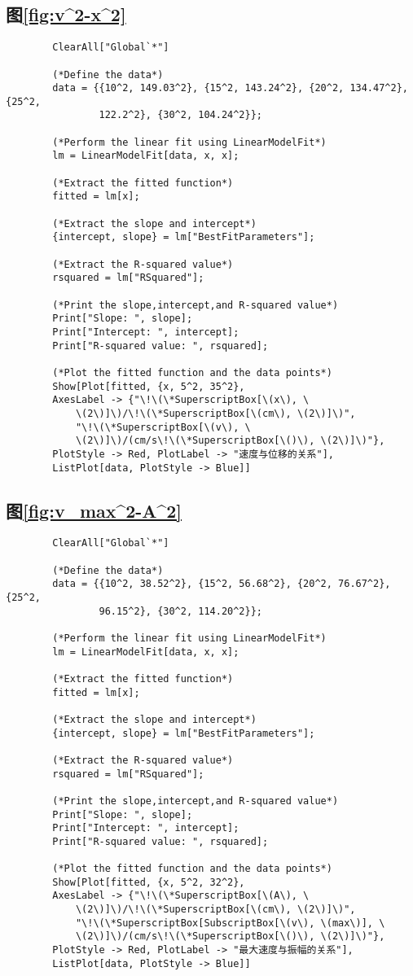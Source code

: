 \documentclass[11pt]{article}
\begin{document}
	\subsection{图\ref{fig:v^2-x^2}}
	\begin{lstlisting}
		ClearAll["Global`*"]
		
		(*Define the data*)
		data = {{10^2, 149.03^2}, {15^2, 143.24^2}, {20^2, 134.47^2}, {25^2, 
				122.2^2}, {30^2, 104.24^2}};
		
		(*Perform the linear fit using LinearModelFit*)
		lm = LinearModelFit[data, x, x];
		
		(*Extract the fitted function*)
		fitted = lm[x];
		
		(*Extract the slope and intercept*)
		{intercept, slope} = lm["BestFitParameters"];
		
		(*Extract the R-squared value*)
		rsquared = lm["RSquared"];
		
		(*Print the slope,intercept,and R-squared value*)
		Print["Slope: ", slope];
		Print["Intercept: ", intercept];
		Print["R-squared value: ", rsquared];
		
		(*Plot the fitted function and the data points*)
		Show[Plot[fitted, {x, 5^2, 35^2}, 
		AxesLabel -> {"\!\(\*SuperscriptBox[\(x\), \
			\(2\)]\)/\!\(\*SuperscriptBox[\(cm\), \(2\)]\)", 
			"\!\(\*SuperscriptBox[\(v\), \
			\(2\)]\)/(cm/s\!\(\*SuperscriptBox[\()\), \(2\)]\)"}, 
		PlotStyle -> Red, PlotLabel -> "速度与位移的关系"], 
		ListPlot[data, PlotStyle -> Blue]]
	\end{lstlisting}

	\subsection{图\ref{fig:v_max^2-A^2}}
	\begin{lstlisting}
		ClearAll["Global`*"]
		
		(*Define the data*)
		data = {{10^2, 38.52^2}, {15^2, 56.68^2}, {20^2, 76.67^2}, {25^2, 
				96.15^2}, {30^2, 114.20^2}};
		
		(*Perform the linear fit using LinearModelFit*)
		lm = LinearModelFit[data, x, x];
		
		(*Extract the fitted function*)
		fitted = lm[x];
		
		(*Extract the slope and intercept*)
		{intercept, slope} = lm["BestFitParameters"];
		
		(*Extract the R-squared value*)
		rsquared = lm["RSquared"];
		
		(*Print the slope,intercept,and R-squared value*)
		Print["Slope: ", slope];
		Print["Intercept: ", intercept];
		Print["R-squared value: ", rsquared];
		
		(*Plot the fitted function and the data points*)
		Show[Plot[fitted, {x, 5^2, 32^2}, 
		AxesLabel -> {"\!\(\*SuperscriptBox[\(A\), \
			\(2\)]\)/\!\(\*SuperscriptBox[\(cm\), \(2\)]\)", 
			"\!\(\*SuperscriptBox[SubscriptBox[\(v\), \(max\)], \
			\(2\)]\)/(cm/s\!\(\*SuperscriptBox[\()\), \(2\)]\)"}, 
		PlotStyle -> Red, PlotLabel -> "最大速度与振幅的关系"], 
		ListPlot[data, PlotStyle -> Blue]]
	\end{lstlisting}
	
\end{document}
